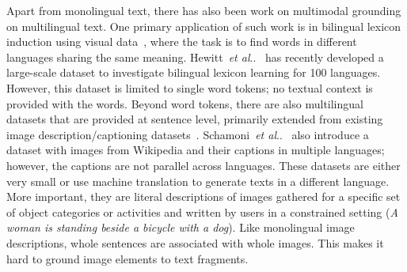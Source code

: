 \documentclass[twocolumn]{svjour3}          \smartqed  \usepackage{graphicx}
\makeatletter
\DeclareRobustCommand\onedot{\futurelet\@let@token\@onedot}
\def\@onedot{\ifx\@let@token.\else.\null\fi\xspace}
\newcommand{\etal}{\emph{et al}\onedot}
\makeatother
\begin{document}
Apart from monolingual text, there has also been work on multimodal grounding on multilingual text. One primary application of such work is in bilingual lexicon induction using visual data~\cite{KielaEtAl:2015}, where the task is to find words in different languages sharing the same meaning. Hewitt~\etal~\cite{HewittEtAl:2018} has recently developed a large-scale dataset to investigate bilingual lexicon learning for 100 languages. However, this dataset is limited to single word tokens; no textual context is provided with the words. Beyond word tokens, there are also multilingual datasets that are provided at sentence level, primarily extended from existing image description/captioning datasets~\cite{ElliottEtAl:2016,MiyazakiShimizu:2016}. Schamoni~\etal~\cite{SchamoniEtAl:2018} also introduce a dataset with images from Wikipedia and their captions in multiple languages; however, the captions are not parallel across languages. These datasets are either very small or use machine translation to generate texts in a different language. More important, they are literal descriptions of images gathered for a specific set of object categories or activities and written by users in a constrained setting (\textit{A woman is standing beside a bicycle with a dog}). Like monolingual image descriptions, whole sentences are associated with whole images. This makes it hard to ground image elements to text fragments. 



\begin{comment}
\paragraph{Sense annotation.}

The use of parallel corpora for sense identification has been investigated in early work on word sense disambiguation (WSD). Dagan~\cite{Dagan:1991} was the first to note the usefulness of corpora in two languages for lexical semantic disambiguation in the context of machine translation. Senses are indicated, as in our work, by possible translations of a word. 
Possible translations for source words are selected based on their likelihood to be translation pairs in a large parallel corpus.  
This idea is later explored with five languages 
in \cite{LefeverHoste:2014} and to label training corpora for WSD \cite{Gale:1992}, including the use of including using machine translations instead of parallel corpora in \cite{DiabResnik:2002}.
Senses as given by parallel corpora have also been used to create lexicons and other lexical resources (e.g. \cite{LefeverHoste:2010}).

Different from our work,  disambiguation and sense annotation in previous work was done solely based on the sense that manifest as translations. We use senses from BabelNet and rely on images for further decision on word ambiguity and senses.  

\end{comment}
\end{document}
